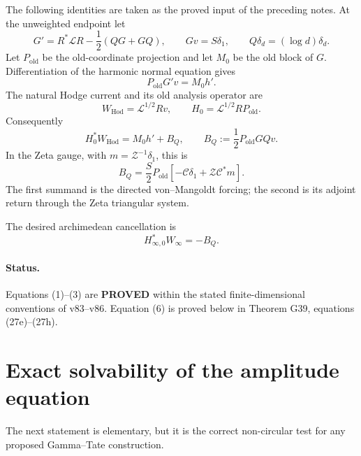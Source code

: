 \documentclass[11pt]{article}
\newcommand{\PROVED}{\textcolor{green!45!black}{\textbf{PROVED}}}
\newcommand{\old}{\mathrm{old}}
\newcommand{\Hod}{\mathrm{Hod}}
\newcommand{\cC}{\mathscr C}
\newcommand{\cZ}{\mathscr Z}
\newcommand{\cL}{\mathscr L}
\begin{document}
The following identities are taken as the proved input of the preceding
notes.  At the unweighted endpoint let
\[
 G'=R^*\cL R-\frac12(QG+GQ),\qquad Gv=S\delta_1,
 \qquad Q\delta_d=(\log d)\delta_d .
\]
Let $P_{\old}$ be the old-coordinate projection and let $M_0$ be the old
block of $G$.  Differentiation of the harmonic normal equation gives
\begin{equation}
 P_{\old}G'v=M_0h'.                                      \tag{1}
\end{equation}
The natural Hodge current and its old analysis operator are
\[
 W_{\Hod}=\cL^{1/2}Rv,
 \qquad H_0=\cL^{1/2}RP_{\old}.
\]
Consequently
\begin{equation}
 H_0^*W_{\Hod}=M_0h'+B_Q,
 \qquad B_Q:=\frac12P_{\old}GQv.                         \tag{2}
\end{equation}
In the Zeta gauge, with $m=\cZ^{-1}\delta_1$, this is
\begin{equation}
 B_Q=\frac S2P_{\old}
 \left[-\cC\delta_1+\cZ\cC^*m\right].                  \tag{3}
\end{equation}
The first summand is the directed von--Mangoldt forcing; the second is its
adjoint return through the Zeta triangular system.

The desired archimedean cancellation is
\begin{equation}
 H_{\infty,0}^*W_\infty=-B_Q.                            \tag{6}
\end{equation}

\paragraph{Status.} Equations (1)--(3) are \PROVED{} within the stated
finite-dimensional conventions of v83--v86.  Equation (6) is proved below in
Theorem G39, equations (27e)--(27h).

\section{Exact solvability of the amplitude equation}

The next statement is elementary, but it is the correct non-circular test for
any proposed Gamma--Tate construction.
\end{document}
